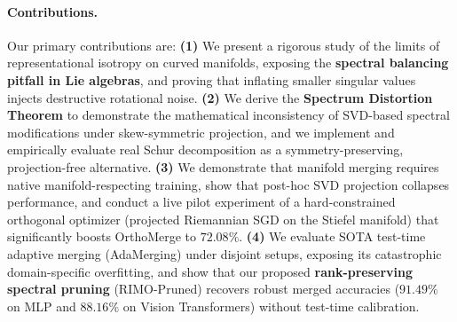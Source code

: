 \paragraph{Contributions.} Our primary contributions are:
\textbf{(1)} We present a rigorous study of the limits of representational isotropy on curved manifolds, exposing the \textbf{spectral balancing pitfall in Lie algebras}, and proving that inflating smaller singular values injects destructive rotational noise.
\textbf{(2)} We derive the \textbf{Spectrum Distortion Theorem} to demonstrate the mathematical inconsistency of SVD-based spectral modifications under skew-symmetric projection, and we implement and empirically evaluate real Schur decomposition as a symmetry-preserving, projection-free alternative.
\textbf{(3)} We demonstrate that manifold merging requires native manifold-respecting training, show that post-hoc SVD projection collapses performance, and conduct a live pilot experiment of a hard-constrained orthogonal optimizer (projected Riemannian SGD on the Stiefel manifold) that significantly boosts OrthoMerge to $72.08\%$.
\textbf{(4)} We evaluate SOTA test-time adaptive merging (AdaMerging) under disjoint setups, exposing its catastrophic domain-specific overfitting, and show that our proposed \textbf{rank-preserving spectral pruning} (RIMO-Pruned) recovers robust merged accuracies ($91.49\%$ on MLP and $88.16\%$ on Vision Transformers) without test-time calibration.
